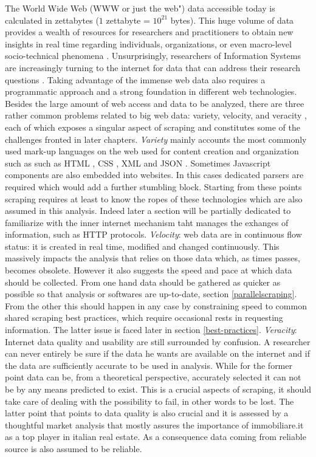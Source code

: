 \documentclass[
  12pt,
  a4paper,
  oneside]{book}
\theoremstyle{definition}
\theoremstyle{definition}
\theoremstyle{definition}
\theoremstyle{remark}
\begin{document}
The World Wide Web (WWW or just the web") data accessible today is calculated in zettabytes \citep{ciscooutlook} (\(1\) zettabyte = \(10^{21}\) bytes). This huge volume of data provides a wealth of resources for researchers and practitioners to obtain new insights in real time regarding individuals, organizations, or even macro-level socio-technical phenomena \citep{krotovtennyson}. Unsurprisingly, researchers of Information Systems are increasingly turning to the internet for data that can address their research questions \citeyearpar{krotovtennyson}. Taking advantage of the immense web data also requires a programmatic approach and a strong foundation in different web technologies.
Besides the large amount of web access and data to be analyzed, there are three rather common problems related to big web data: variety, velocity, and veracity \citep{LegalityEthicsWS}, each of which exposes a singular aspect of scraping and constitutes some of the challenges fronted in later chapters.
\emph{Variety} mainly accounts the most commonly used mark-up languages on the web used for content creation and organization such as such as HTML \citep{html_2020}, CSS \citep{css_2020}, XML \citep{wiki:XML} and JSON \citep{wiki:JSON}. Sometimes Javascript \citep{wiki:Javascript} components are also embedded into websites. In this cases dedicated parsers are required which would add a further stumbling block. Starting from these points scraping requires at least to know the ropes of these technologies which are also assumed in this analysis. Indeed later a section will be partially dedicated to familiarize with the inner internet mechanism taht manages the exhanges of information, such as HTTP protocols.
\emph{Velocity}: web data are in continuous flow status: it is created in real time, modified and changed continuously. This massively impacts the analysis that relies on those data which, as times passes, becomes obsolete. However it also suggests the speed and pace at which data should be collected. From one hand data should be gathered as quicker as possible so that analysis or softwares are up-to-date, section \ref{parallelscraping}. From the other this should happen in any case by constraining speed to common shared scraping best practices, which require occasional rests in requesting information. The latter issue is faced later in section \ref{best-practices}.
\emph{Veracity}: Internet data quality and usability are still surrounded by confusion. A researcher can never entirely be sure if the data he wants are available on the internet and if the data are sufficiently accurate to be used in analysis. While for the former point data can be, from a theoretical perspective, accurately selected it can not be by any means predicted to exist. This is a crucial aspects of scraping, it should take care of dealing with the possibility to fail, in other words to be lost. The latter point that points to data quality is also crucial and it is assessed by a thoughtful market analysis that mostly assures the importance of immobiliare.it as a top player in italian real estate. As a consequence data coming from reliable source is also assumed to be reliable.
\end{document}
